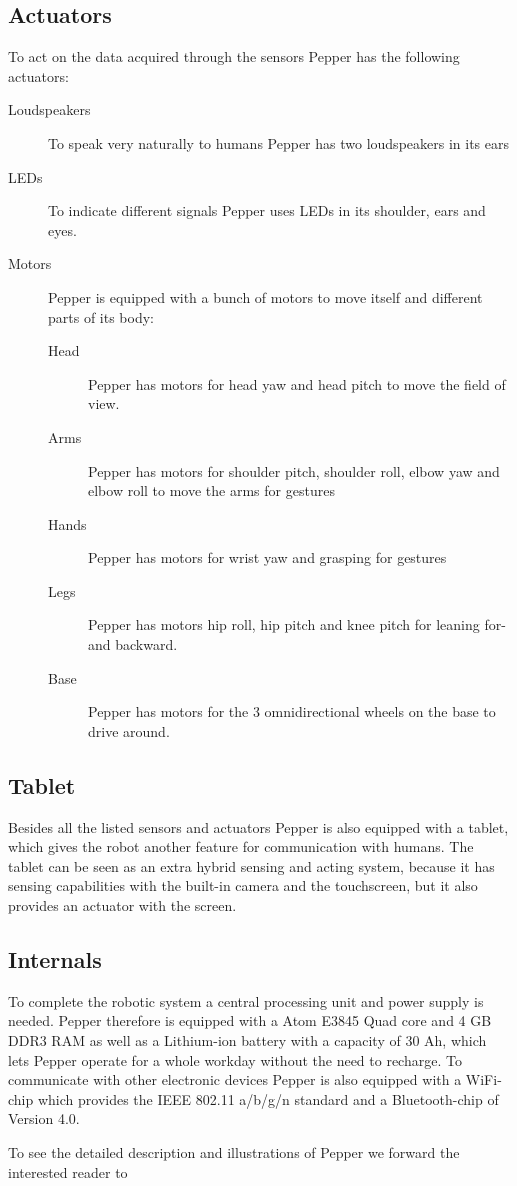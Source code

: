 \subsection*{Actuators}
To act on the data acquired through the sensors Pepper has the following actuators:
\begin{description}
  \item [Loudspeakers] To speak very naturally to humans Pepper has two loudspeakers in its ears
  \item [LEDs] To indicate different signals Pepper uses LEDs in its shoulder, ears and eyes.
  \item [Motors] Pepper is equipped with a bunch of motors to move itself and different parts of its body:
  \begin{description}
    \item [Head] Pepper has motors for head yaw	and head pitch to move the field of view.
    \item [Arms] Pepper has motors for shoulder pitch, shoulder roll, elbow yaw and elbow roll to move the arms for gestures
    \item [Hands] Pepper has motors for wrist yaw	and grasping for gestures
    \item [Legs] Pepper has motors hip roll, hip pitch and knee pitch for leaning for- and backward.
    \item [Base] Pepper has motors for the 3 omnidirectional wheels on the base to drive around.
  \end{description}
\end{description}

\subsection*{Tablet}
Besides all the listed sensors and actuators Pepper is also equipped with a tablet, which gives the robot another feature for communication with humans. The tablet can be seen as an extra hybrid sensing and acting system, because it has sensing capabilities with the built-in camera and the touchscreen, but it also provides an actuator with the screen.

\subsection*{Internals}
To complete the robotic system a central processing unit and power supply is needed.
Pepper therefore is equipped with a Atom E3845 Quad core and 4 GB DDR3 RAM as well as a Lithium-ion battery with a capacity of 30 Ah, which lets Pepper operate for a whole workday without the need to recharge.
To communicate with other electronic devices Pepper is also equipped with a WiFi-chip which provides the IEEE 802.11 a/b/g/n standard and a Bluetooth-chip of Version 4.0.

To see the detailed description and illustrations of Pepper we forward the interested reader to \cite{Pepper2018}

